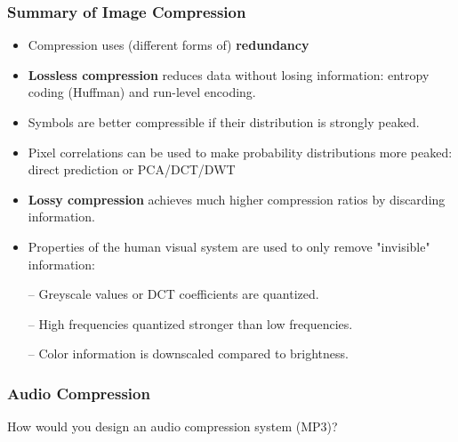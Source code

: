 \documentclass{beamer}
\begin{document}
\begin{frame}
\frametitle{Summary of Image Compression}
\begin{itemize}
\item Compression uses (different forms of) \textbf{redundancy}
\end{itemize}
\begin{itemize}
\item \textbf{Lossless compression} reduces data without losing information: entropy coding (Huffman) and run-level encoding.
\item Symbols are better compressible if their distribution is strongly peaked.
\item Pixel correlations can be used to make probability distributions more peaked: direct prediction or PCA/DCT/DWT
\end{itemize}
\begin{itemize}
\item \textbf{Lossy compression} achieves much higher compression ratios by discarding information.
\item Properties of the human visual system are used to only remove "invisible" information:

-- Greyscale values or DCT coefficients are quantized.

-- High frequencies quantized stronger than low frequencies.

-- Color information is downscaled compared to brightness.

\end{itemize}
\end{frame}

\begin{frame}
\frametitle{Audio Compression}
How would you design an audio compression system (MP3)?
\end{frame}


\end{document}
